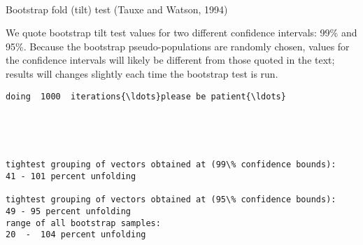 \documentclass[11pt]{article}
\begin{document}
    \begin{center}
    \end{center}
    { \hspace*{\fill} \\}
    
    Bootstrap fold (tilt) test (Tauxe and Watson, 1994)

    We quote bootstrap tilt test values for two different confidence
intervals: 99\% and 95\%. Because the bootstrap pseudo-populations are
randomly chosen, values for the confidence intervals will likely be
different from those quoted in the text; results will changes slightly
each time the bootstrap test is run.


    \begin{Verbatim}[commandchars=\\\{\}]
doing  1000  iterations{\ldots}please be patient{\ldots}

    \end{Verbatim}

    \begin{center}
    \end{center}
    { \hspace*{\fill} \\}
    
    \begin{center}
    \end{center}
    { \hspace*{\fill} \\}
    
    \begin{Verbatim}[commandchars=\\\{\}]
tightest grouping of vectors obtained at (99\% confidence bounds):
41 - 101 percent unfolding

tightest grouping of vectors obtained at (95\% confidence bounds):
49 - 95 percent unfolding
range of all bootstrap samples: 
20  -  104 percent unfolding

    \end{Verbatim}

    \begin{center}
    \end{center}
    { \hspace*{\fill} \\}
    
\end{document}
